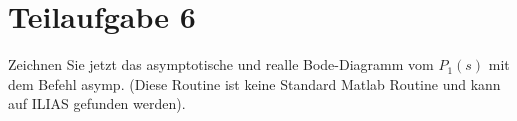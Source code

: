 \section{Teilaufgabe 6}
\begin{aufgabe}
Zeichnen Sie jetzt das asymptotische und realle Bode-Diagramm vom $P_1(s)$ mit 
dem Befehl asymp. (Diese Routine ist keine Standard Matlab Routine und kann 
auf ILIAS gefunden werden).
\end{aufgabe}
